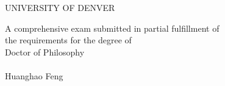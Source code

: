 \newpage
\thispagestyle{empty}
\renewcommand{\baselinestretch}{1.3}
\begin{center}

UNIVERSITY OF DENVER\\
\vspace{0.5in}

A comprehensive exam submitted in partial fulfillment of \\
the requirements for the degree of\\
Doctor of Philosophy\\
\vspace{1in} {\large \mytitleA}\\
\vspace{0.75in}
Huanghao Feng\\
\vspace{0.5in}
\begin{flushleft}
\end{flushleft}
\vspace{0.5in}
\renewcommand{\arraystretch}{0.75}
\setlength{\tabcolsep}{0.5in} 
\end{center}
